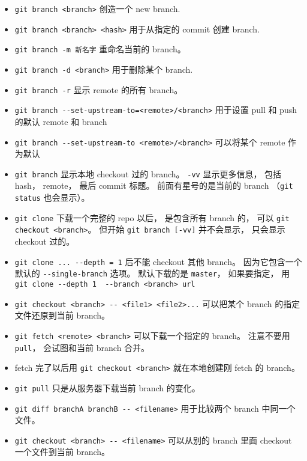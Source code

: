 \begin{itemize}
\item \verb|git branch <branch>| 创造一个 new branch.
\item \verb|git branch <branch> <hash>| 用于从指定的 commit 创建 branch.
\item \verb|git branch -m 新名字| 重命名当前的 branch。
\item \verb|git branch -d <branch>| 用于删除某个 branch.
\item \verb|git branch -r| 显示 remote 的所有 branch。
\item \verb|git branch --set-upstream-to=<remote>/<branch>| 用于设置 pull 和 push 的默认 remote 和 branch
\item \verb|git branch --set-upstream-to <remote>/<branch>| 可以将某个 remote 作为默认
\item \verb|git branch| 显示本地 checkout 过的 branch。 \verb|-vv| 显示更多信息， 包括 hash， remote， 最后 commit 标题。 前面有星号的是当前的 branch （\verb|git status| 也会显示）。
\item \verb|git clone| 下载一个完整的 repo 以后， 是包含所有 branch 的， 可以 \verb|git checkout <branch>|。 但开始 \verb|git branch [-vv]| 并不会显示， 只会显示 checkout 过的。
\item \verb|git clone ... --depth = 1| 后不能 checkout 其他 branch。 因为它包含一个默认的 \verb|--single-branch| 选项。 默认下载的是 \verb|master|， 如果要指定， 用 \verb|git clone --depth 1  --branch <branch> url|
\item \verb|git checkout <branch> -- <file1> <file2>...| 可以把某个 branch 的指定文件还原到当前 branch。
\item \verb|git fetch <remote> <branch>| 可以下载一个指定的 branch。 注意不要用 \verb|pull|， 会试图和当前 branch 合并。
\item fetch 完了以后用 \verb|git checkout <branch>| 就在本地创建刚 fetch 的 branch。
\item \verb|git pull| 只是从服务器下载当前 branch 的变化。
\item \verb|git diff branchA branchB -- <filename>| 用于比较两个 branch 中同一个文件。
\item \verb|git checkout <branch> -- <filename>| 可以从别的 branch 里面 checkout 一个文件到当前 branch。


\end{itemize}

